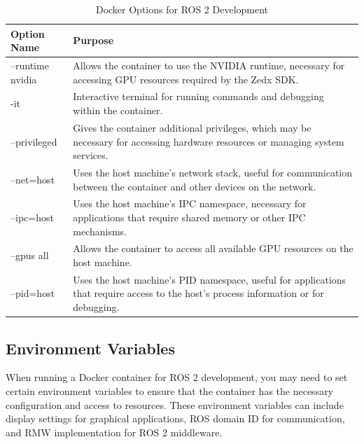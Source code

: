 \begin{table}[H]
    \centering
    \begin{tabular}{|l|p{10cm}|}
        \hline
        \textbf{Option Name} & \textbf{Purpose} \\
        \hline
        --runtime nvidia & Allows the container to use the NVIDIA runtime, necessary for accessing GPU resources required by the Zedx SDK. \\
        \hline
        -it & Interactive terminal for running commands and debugging within the container. \\
        \hline
        --privileged & Gives the container additional privileges, which may be necessary for accessing hardware resources or managing system services. \\
        \hline
        --net=host & Uses the host machine's network stack, useful for communication between the container and other devices on the network. \\
        \hline
        --ipc=host & Uses the host machine's IPC namespace, necessary for applications that require shared memory or other IPC mechanisms. \\
        \hline
        --gpus all & Allows the container to access all available GPU resources on the host machine. \\
        \hline
        --pid=host & Uses the host machine's PID namespace, useful for applications that require access to the host's process information or for debugging. \\
        \hline
    \end{tabular}
    \caption{Docker Options for ROS 2 Development}
    \label{tab:docker-options}
\end{table}

\subsection{Environment Variables}

When running a Docker container for ROS 2 development, you may need to set certain environment variables to ensure that the container has the necessary configuration and access to resources. These environment variables can include display settings for graphical applications, ROS domain ID for communication, and RMW implementation for ROS 2 middleware.

